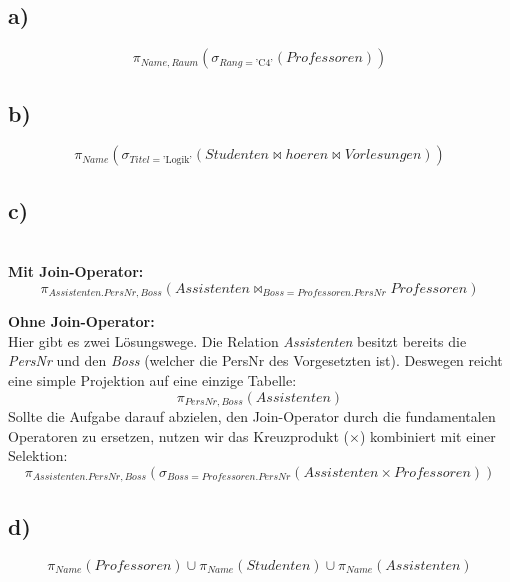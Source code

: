 \documentclass[12pt]{scrartcl}
\begin{document}


	\newpage



	\subsection*{a)}
	\[
		\pi_{Name, Raum}(\sigma_{Rang = \text{'C4'}}(Professoren))
	\]

	\subsection*{b) }
	\[
		\pi_{Name}(\sigma_{Titel = \text{'Logik'}}(Studenten \bowtie hoeren \bowtie Vorlesungen))
	\]

	\subsection*{c)} \\
	\textbf{Mit Join-Operator:} \\
	\[
		\pi_{Assistenten.PersNr, Boss}(Assistenten \bowtie_{Boss = Professoren.PersNr} Professoren)
	\]

	\noindent \textbf{Ohne Join-Operator:} \\
	Hier gibt es zwei Lösungswege.
	Die Relation \textit{Assistenten} besitzt bereits die \textit{PersNr} und den \textit{Boss} (welcher die PersNr des Vorgesetzten ist).
	Deswegen reicht eine simple Projektion auf eine einzige Tabelle:
	\[
		\pi_{PersNr, Boss}(Assistenten)
	\]
	 Sollte die Aufgabe darauf abzielen, den Join-Operator durch die fundamentalen Operatoren zu ersetzen, nutzen wir das Kreuzprodukt ($\times$) kombiniert mit einer Selektion:
	\[
		\pi_{Assistenten.PersNr, Boss}(\sigma_{Boss = Professoren.PersNr}(Assistenten \times Professoren))
	\]

	\subsection*{d)}
	\[
		\pi_{Name}(Professoren) \cup \pi_{Name}(Studenten) \cup \pi_{Name}(Assistenten)
	\]
\end{document}
